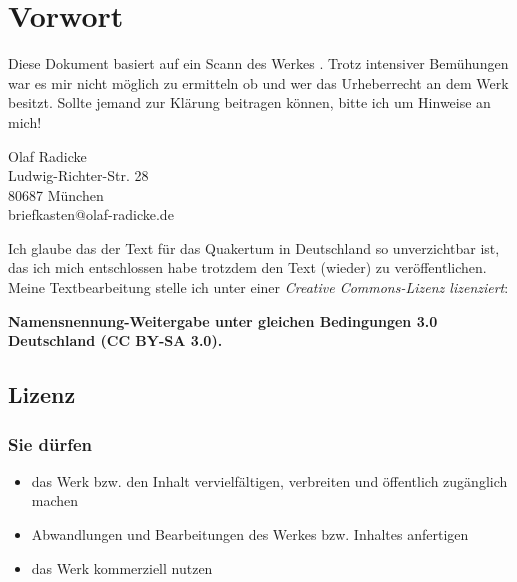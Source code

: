 \chapter{Vorwort}
\label{sec:vorwort}

Diese Dokument basiert auf ein Scann des Werkes . Trotz intensiver 
Bemühungen war es mir nicht möglich zu ermitteln ob und wer das 
Urheberrecht an dem Werk besitzt. Sollte jemand zur
Klärung beitragen können, bitte ich um Hinweise an mich!

\begin{center}
Olaf Radicke \\
Ludwig-Richter-Str. 28 \\
80687 München \\
briefkasten@olaf-radicke.de \\
\end{center}

Ich glaube das der Text für das Quakertum in Deutschland so 
unverzichtbar ist, das ich mich entschlossen habe trotzdem den Text 
(wieder) zu veröffentlichen. Meine Textbearbeitung stelle ich unter 
einer \textit{Creative Commons-Lizenz lizenziert}: 

\bigskip

\begin{center}
\textbf{Namensnennung-Weitergabe unter gleichen Bedingungen 3.0 
Deutschland (CC BY-SA 3.0).}
\end{center}

\section*{Lizenz}
\subsection*{Sie dürfen}

\begin{itemize}
 \item das Werk bzw. den Inhalt vervielfältigen, verbreiten und öffentlich zugänglich machen
 \item Abwandlungen und Bearbeitungen des Werkes bzw. Inhaltes anfertigen
 \item das Werk kommerziell nutzen
\end{itemize}

